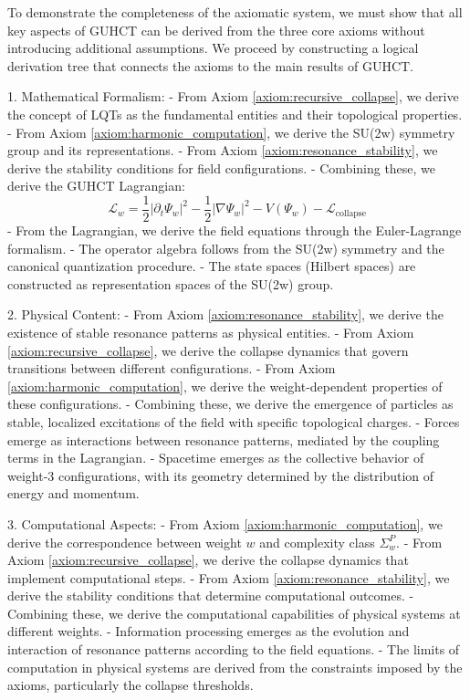 \documentclass[11pt,a4paper]{article}
\makeatletter
\renewenvironment{proof}[1][\proofname]{\par
  \pushQED{\qed}%
  \normalfont \topsep6\p@\@plus6\p@\relax
  \trivlist
  \item[\hskip\labelsep
        \itshape
    #1\@addpunct{.}]\ignorespaces
}{%
  \popQED\endtrivlist\@endpefalse
}
\makeatother
\begin{document}
\begin{proof}
To demonstrate the completeness of the axiomatic system, we must show that all key aspects of GUHCT can be derived from the three core axioms without introducing additional assumptions. We proceed by constructing a logical derivation tree that connects the axioms to the main results of GUHCT.

1. Mathematical Formalism:
   - From Axiom \ref{axiom:recursive_collapse}, we derive the concept of LQTs as the fundamental entities and their topological properties.
   - From Axiom \ref{axiom:harmonic_computation}, we derive the SU(2w) symmetry group and its representations.
   - From Axiom \ref{axiom:resonance_stability}, we derive the stability conditions for field configurations.
   - Combining these, we derive the GUHCT Lagrangian:
     \begin{equation}
     \mathcal{L}_w = \frac{1}{2}|\partial_t\Psi_w|^2 - \frac{1}{2}|\nabla\Psi_w|^2 - V(\Psi_w) - \mathcal{L}_{\text{collapse}}
     \end{equation}
   - From the Lagrangian, we derive the field equations through the Euler-Lagrange formalism.
   - The operator algebra follows from the SU(2w) symmetry and the canonical quantization procedure.
   - The state spaces (Hilbert spaces) are constructed as representation spaces of the SU(2w) group.

2. Physical Content:
   - From Axiom \ref{axiom:resonance_stability}, we derive the existence of stable resonance patterns as physical entities.
   - From Axiom \ref{axiom:recursive_collapse}, we derive the collapse dynamics that govern transitions between different configurations.
   - From Axiom \ref{axiom:harmonic_computation}, we derive the weight-dependent properties of these configurations.
   - Combining these, we derive the emergence of particles as stable, localized excitations of the field with specific topological charges.
   - Forces emerge as interactions between resonance patterns, mediated by the coupling terms in the Lagrangian.
   - Spacetime emerges as the collective behavior of weight-3 configurations, with its geometry determined by the distribution of energy and momentum.

3. Computational Aspects:
   - From Axiom \ref{axiom:harmonic_computation}, we derive the correspondence between weight $w$ and complexity class $\Sigma_w^P$.
   - From Axiom \ref{axiom:recursive_collapse}, we derive the collapse dynamics that implement computational steps.
   - From Axiom \ref{axiom:resonance_stability}, we derive the stability conditions that determine computational outcomes.
   - Combining these, we derive the computational capabilities of physical systems at different weights.
   - Information processing emerges as the evolution and interaction of resonance patterns according to the field equations.
   - The limits of computation in physical systems are derived from the constraints imposed by the axioms, particularly the collapse thresholds.


\end{proof}
\end{document}
